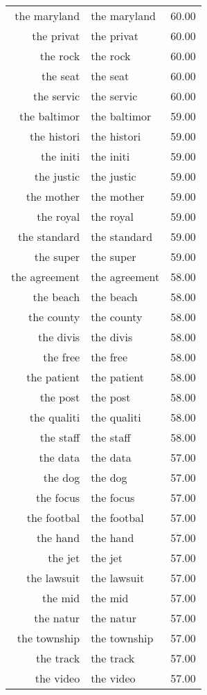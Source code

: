 \begin{table}[ht]
\begin{tabular}{rlr}
  the maryland & the maryland & 60.00 \\ 
  the privat & the privat & 60.00 \\ 
  the rock & the rock & 60.00 \\ 
  the seat & the seat & 60.00 \\ 
  the servic & the servic & 60.00 \\ 
  the baltimor & the baltimor & 59.00 \\ 
  the histori & the histori & 59.00 \\ 
  the initi & the initi & 59.00 \\ 
  the justic & the justic & 59.00 \\ 
  the mother & the mother & 59.00 \\ 
  the royal & the royal & 59.00 \\ 
  the standard & the standard & 59.00 \\ 
  the super & the super & 59.00 \\ 
  the agreement & the agreement & 58.00 \\ 
  the beach & the beach & 58.00 \\ 
  the county & the county & 58.00 \\ 
  the divis & the divis & 58.00 \\ 
  the free & the free & 58.00 \\ 
  the patient & the patient & 58.00 \\ 
  the post & the post & 58.00 \\ 
  the qualiti & the qualiti & 58.00 \\ 
  the staff & the staff & 58.00 \\ 
  the data & the data & 57.00 \\ 
  the dog & the dog & 57.00 \\ 
  the focus & the focus & 57.00 \\ 
  the footbal & the footbal & 57.00 \\ 
  the hand & the hand & 57.00 \\ 
  the jet & the jet & 57.00 \\ 
  the lawsuit & the lawsuit & 57.00 \\ 
  the mid & the mid & 57.00 \\ 
  the natur & the natur & 57.00 \\ 
  the township & the township & 57.00 \\ 
  the track & the track & 57.00 \\ 
  the video & the video & 57.00 \\ 

\end{tabular}
\end{table}
